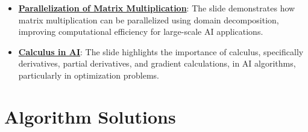 \documentclass{article}%
\begin{document}
\begin{itemize}[leftmargin=*]
\item \href{https://purdue.brightspace.com/d2l/common/assets/pdfjs-d2l-dist/1.0.14-legacy/web/viewer.html?file=\%2Fcontent\%2Fenforced\%2F1095467-wl.202510.CS.24300.001\%2F04L1-Linear Algebra Primer.pdf\%3Fou\%3D1095467\&lang=en-us\&container=d2l-fileviewer-rendered-pdf\&fullscreen=d2l-fileviewer-rendered-pdf-dialog\&height=667#page=18}{\textbf{Parallelization of Matrix Multiplication}}: The slide demonstrates how matrix multiplication can be parallelized using domain decomposition, improving computational efficiency for large{-}scale AI applications.%
\item \href{https://purdue.brightspace.com/d2l/common/assets/pdfjs-d2l-dist/1.0.14-legacy/web/viewer.html?file=\%2Fcontent\%2Fenforced\%2F1095467-wl.202510.CS.24300.001\%2F04L1-Linear Algebra Primer.pdf\%3Fou\%3D1095467\&lang=en-us\&container=d2l-fileviewer-rendered-pdf\&fullscreen=d2l-fileviewer-rendered-pdf-dialog\&height=667#page=19}{\textbf{Calculus in AI}}: The slide highlights the importance of calculus, specifically derivatives, partial derivatives, and gradient calculations, in AI algorithms, particularly in optimization problems.%
\end{itemize}

%
\section{Algorithm Solutions}%
\label{sec:AlgorithmSolutions}%
\end{document}
